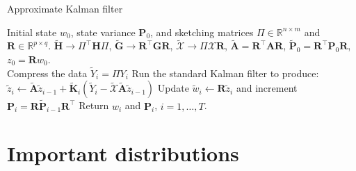 \documentclass[10pt]{article}
\newcommand{\R}{\mathbb{R}}
\newcommand{\X}{\mathcal{X}}
\begin{document}
\begin{algorithm}[t!]
  \caption{Approximate Kalman filter\label{alg:kalman}}
  \begin{algorithmic}[1]
  Initial state $w_0$, state variance $\mathbf{P}_0$,
    and sketching matrices $\Pi\in\R^{n\times m}$ and
    $\mathbf{R}\in\R^{p\times q}$.
   $\tilde{\mathbf{H}}\rightarrow\Pi^\top
  \mathbf{H} \Pi$, $\tilde{\mathbf{G}}\rightarrow \mathbf{R}^\top
  \mathbf{G}\mathbf{R}$, $\tilde{\X}\rightarrow \Pi\X\mathbf{R}$,
  $\tilde{\mathbf{A}} = \mathbf{R}^\top \mathbf{A} \mathbf{R}$,
  $\tilde{\mathbf{P}}_0 = \mathbf{R}^\top \mathbf{P}_0\mathbf{R}$,
  $z_0=\mathbf{R}w_0$. \\ 
    \STATE Compress the data $\tilde{Y}_i=\Pi Y_i$
    \STATE Run the standard Kalman filter to produce:
    $
    \tilde{z}_{i} \leftarrow
    \tilde{\mathbf{A}}\tilde{z}_{i-1}+\tilde{\mathbf{K}}_i(\tilde{Y}_i -
    \tilde{\X}\tilde{\mathbf{A}}\tilde{z}_{i-1}) 
    $
    \STATE Update 
    $\tilde{w}_i \leftarrow \mathbf{R}\tilde{z}_i$ and increment $\mathbf{P}_{i} = 
    \mathbf{R}\tilde{\mathbf{P}}_{i-1} \mathbf{R}^\top$\;
  \ENDFOR
  \STATE Return $w_i$ and $\mathbf{P}_i$, $i=1,\ldots,T$.
\end{algorithmic}
\end{algorithm}


\section{Important distributions}
\label{sec:import-distr}
\end{document}
